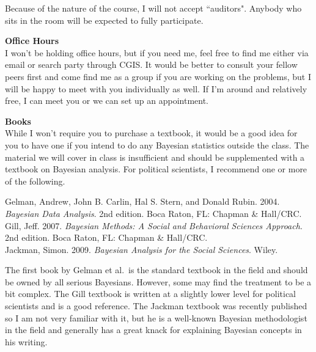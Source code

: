 \documentclass[10pt,a4paper]{article}
\begin{document}
Because of the nature of the course, I will not accept ``auditors".  Anybody who sits in the room will be expected to fully participate. \\

\bigskip

\textbf{Office Hours} \\

I won't be holding office hours, but if you need me, feel free to find me either via email or search party through CGIS.  It would be better to consult your fellow peers first and come find me as a group if you are working on the problems, but I will be happy to meet with you individually as well.  If I'm around and relatively free, I can meet you or we can set up an appointment.\\

\bigskip

\textbf{Books} \\

While I won't require you to purchase a textbook, it would be a good idea for you to have one if you intend to do any Bayesian statistics outside the class.  The material we will cover in class is insufficient and should be supplemented with a textbook on Bayesian analysis.  For political scientists, I recommend one or more of the following. \\

\everypar{\hangindent = 1em}

Gelman, Andrew, John B. Carlin, Hal S. Stern, and Donald Rubin. 2004. \textit{Bayesian Data Analysis}. 2nd edition. Boca Raton, FL: Chapman \& Hall/CRC. \\

Gill, Jeff. 2007. \textit{Bayesian Methods: A Social and Behavioral Sciences Approach}. 2nd edition. Boca Raton, FL: Chapman \& Hall/CRC.\\

Jackman, Simon. 2009. \textit{Bayesian Analysis for the Social Sciences}.  Wiley. \\
\everypar{\hangindent = 0em}

The first book by Gelman et al.\ is the standard textbook in the field and should be owned by all serious Bayesians.  However, some may find the treatment to be a bit complex.  The Gill textbook is written at a slightly lower level for political scientists and is a good reference.  The Jackman textbook was recently published so I am not very familiar with it, but he is a well-known Bayesian methodologist in the field and generally has a great knack for explaining Bayesian concepts in his writing.\\
\end{document}

